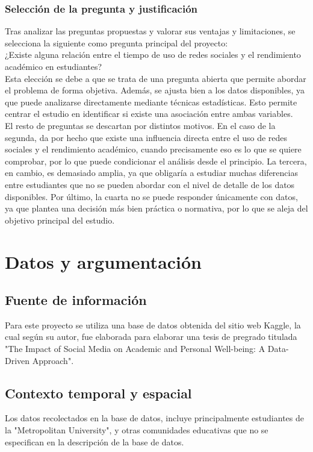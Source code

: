 \documentclass[12pt]{article}
\begin{document}
\subsubsection{Selección de la pregunta y justificación}
Tras analizar las preguntas propuestas y valorar sus ventajas y limitaciones, se selecciona la siguiente como pregunta principal del proyecto:
\\
¿Existe alguna relación entre el tiempo de uso de redes sociales y el rendimiento                   académico en estudiantes?
\\
Esta elección se debe a que se trata de una pregunta abierta que permite abordar el problema de forma objetiva. Además, se ajusta bien a los datos disponibles, ya que puede analizarse directamente mediante técnicas estadísticas. Esto permite centrar el estudio en identificar si existe una asociación entre ambas variables.
\\
El resto de preguntas se descartan por distintos motivos. En el caso de la segunda, da por hecho que existe una influencia directa entre el uso de redes sociales y el rendimiento académico, cuando precisamente eso es lo que se quiere comprobar, por lo que puede condicionar el análisis desde el principio. La tercera, en cambio, es demasiado amplia, ya que obligaría a estudiar muchas diferencias entre estudiantes que no se pueden abordar con el nivel de detalle de los datos disponibles. Por último, la cuarta no se puede responder únicamente con datos, ya que plantea una decisión más bien práctica o normativa, por lo que se aleja del objetivo principal del estudio.



\section{Datos y argumentación}
\subsection{Fuente de información}
Para este proyecto se utiliza una base de datos obtenida del sitio web Kaggle, la cual según su autor, fue elaborada para elaborar una tesis de pregrado titulada "The Impact of Social Media on Academic and Personal Well-being: A Data-Driven Approach".
\subsection{Contexto temporal y espacial}
Los datos recolectados en la base de datos, incluye principalmente estudiantes de la  "Metropolitan University", y otras comunidades educativas que no se especifican en la descripción de la base de datos.
\end{document}
